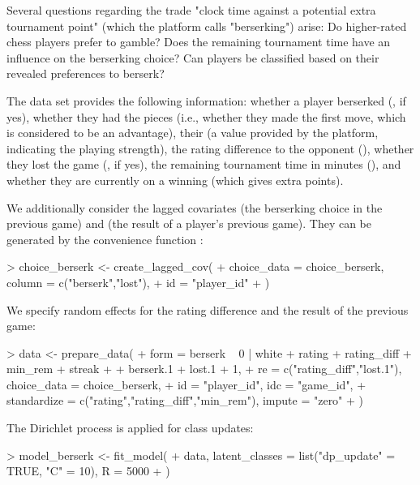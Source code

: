 \documentclass[article,shortnames]{jss}
\newcommand{\fct}[1]{\code{#1()}}
\begin{document}
Several questions regarding the trade "clock time against a potential extra tournament point" (which the platform calls "berserking") arise: Do higher-rated chess players prefer to gamble? Does the remaining tournament time have an influence on the berserking choice? Can players be classified based on their revealed preferences to berserk?

The  data set provides the following information: whether a player berserked (, if yes), whether they had the  pieces (i.e., whether they made the first move, which is considered to be an advantage), their  (a value provided by the platform, indicating the playing strength), the rating difference to the opponent (), whether they lost the game (, if yes), the remaining tournament time in minutes (), and whether they are currently on a winning  (which gives extra points).

We additionally consider the lagged covariates  (the berserking choice in the previous game) and  (the result of a player's previous game). They can be generated by the convenience function \fct{create\_lagged\_cov}:

\begin{Schunk}
\begin{Sinput}
> choice_berserk <- create_lagged_cov(
+    choice_data = choice_berserk, column = c("berserk","lost"),
+    id = "player_id"
+  )
\end{Sinput}
\end{Schunk}

We specify random effects for the rating difference and the result of the previous game:

\begin{Schunk}
\begin{Sinput}
> data <- prepare_data(
+    form = berserk ~ 0 | white + rating + rating_diff + min_rem + streak +
+      berserk.1 + lost.1 + 1,
+    re = c("rating_diff","lost.1"), choice_data = choice_berserk,
+    id = "player_id", idc = "game_id",
+    standardize = c("rating","rating_diff","min_rem"), impute = "zero"
+  )
\end{Sinput}
\end{Schunk}

The Dirichlet process is applied for class updates:

\begin{Schunk}
\begin{Sinput}
> model_berserk <- fit_model(
+    data, latent_classes = list("dp_update" = TRUE, "C" = 10), R = 5000
+  )
\end{Sinput}
\end{Schunk}
\end{document}
